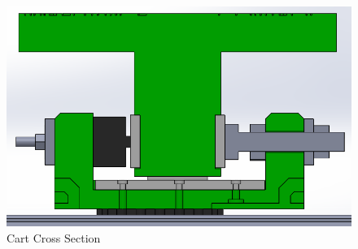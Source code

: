 \begin{figure}
\centering
\includegraphics[width=1\columnwidth]{Images/Ball_Track_Cross_Section}
\caption{Cart Cross Section}
\label{fig:Ball_Track_Cross_Section}
\end{figure}
